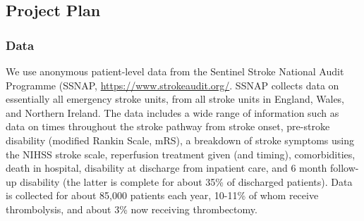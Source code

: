 \subsection{Project Plan}

\subsubsection{Data}

We use anonymous patient-level data from the Sentinel Stroke National Audit Programme (SSNAP, \url{https://www.strokeaudit.org/}. SSNAP collects data on essentially all emergency stroke units, from all stroke units in England, Wales, and Northern Ireland. The data includes a wide range of information such as data on times throughout the stroke pathway from stroke onset, pre-stroke disability (modified Rankin Scale, mRS), a breakdown of stroke symptoms using the NIHSS stroke scale, reperfusion treatment given (and timing), comorbidities, death in hospital, disability at discharge from inpatient care, and 6 month follow-up disability (the latter is complete for about 35\% of discharged patients). Data is collected for about 85,000 patients each year, 10-11\% of whom receive thrombolysis, and about 3\% now receiving thrombectomy.


